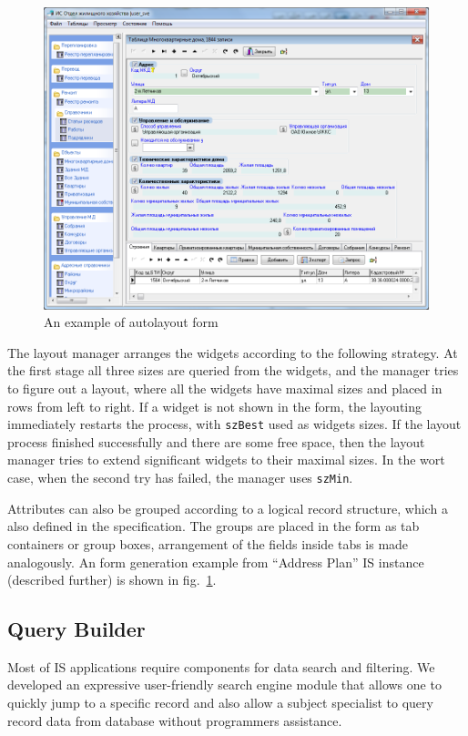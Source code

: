 \documentclass[conference]{IEEEtran}
\begin{document}
\begin{figure}[b]
  \centering
  \includegraphics[width=\linewidth]{formex.png}
  \caption{An example of autolayout form}
  \label{fig:formex}
\end{figure}

The layout manager arranges the widgets according to the following strategy.  At the first stage all three sizes are queried from the widgets, and the manager tries to figure out a layout, where all the widgets have maximal sizes and placed in rows from left to right.  If a widget is not shown in the form, the layouting immediately restarts the process, with \texttt{szBest} used as widgets sizes.  If the layout process finished successfully and there are some free space, then the layout manager tries to extend significant widgets to their maximal sizes.  In the wort case, when the second try has failed, the manager uses \texttt{szMin}.

Attributes can also be grouped according to a logical record structure, which a also defined in the specification.  The groups are placed in the form as tab containers or group boxes, arrangement of the fields inside tabs is made analogously.  An form generation example from ``Address Plan'' IS instance (described further) is shown in fig.~\ref{fig:formex}.

\subsection{Query Builder}
\label{sec:query-builder}

Most of IS applications require components for data search and filtering.  We developed an expressive user-friendly search engine module that allows one to quickly jump to a specific record and also allow a subject specialist to query record data from database without programmers assistance.
\end{document}
